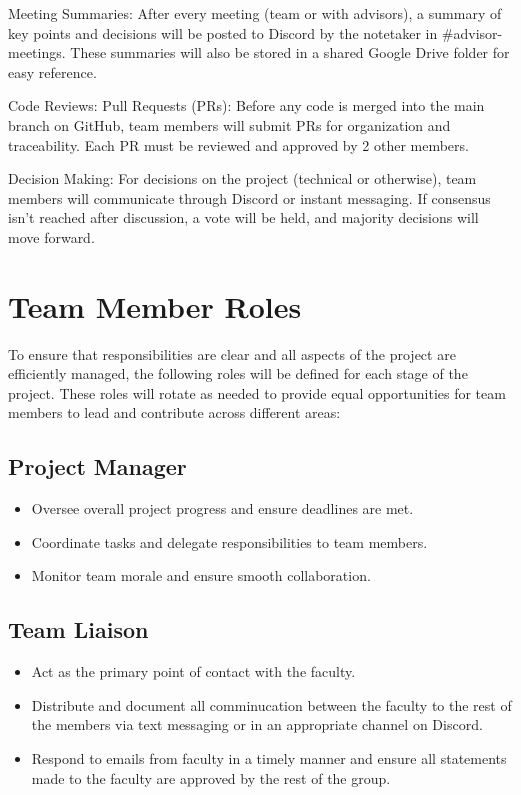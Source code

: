 \documentclass{article}
\begin{document}
\begin{flushleft}
  Meeting Summaries:
  After every meeting (team or with advisors), a summary of key points and decisions will be posted to Discord by the notetaker in \#advisor-meetings. These summaries will also be stored in a shared Google Drive folder for easy reference.\par

  Code Reviews:
  Pull Requests (PRs): Before any code is merged into the main branch on GitHub, team members will submit PRs for organization and traceability. Each PR must be reviewed and approved by 2 other members.\par

  Decision Making:
  For decisions on the project (technical or otherwise), team members will communicate through Discord or instant messaging. If consensus isn’t reached after discussion, a vote will be held, and majority decisions will move forward.\par
\end{flushleft}

\section{Team Member Roles}

To ensure that responsibilities are clear and all aspects of the project are efficiently managed, the following roles will be defined for each stage of the project. These roles will rotate as needed to provide equal opportunities for team members to lead and contribute across different areas:

\subsection{Project Manager} 
  \begin{itemize}
    \item Oversee overall project progress and ensure deadlines are met.
    \item Coordinate tasks and delegate responsibilities to team members.
    \item Monitor team morale and ensure smooth collaboration.
  \end{itemize}

\subsection{Team Liaison}
  \begin{itemize}
    \item Act as the primary point of contact with the faculty.
    \item Distribute and document all comminucation between the faculty to the rest of the members via text messaging or in an appropriate channel on Discord.
    \item Respond to emails from faculty in a timely manner and ensure all statements made to the faculty are approved by the rest of the group.
  \end{itemize}
\end{document}
